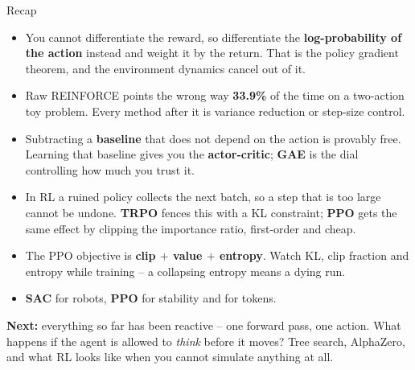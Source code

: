 \documentclass[aspectratio=169]{beamer}
\begin{document}
\begin{frame}{Recap}
  \footnotesize
  \begin{itemize}\itemsep4pt
    \item You cannot differentiate the reward, so differentiate the \textbf{log-probability of
          the action} instead and weight it by the return. That is the policy gradient theorem,
          and the environment dynamics cancel out of it.
    \item Raw REINFORCE points the wrong way \textbf{33.9\%} of the time on a two-action toy
          problem. Every method after it is variance reduction or step-size control.
    \item Subtracting a \textbf{baseline} that does not depend on the action is provably free.
          Learning that baseline gives you the \textbf{actor-critic}; \textbf{GAE} is the dial
          controlling how much you trust it.
    \item In RL a ruined policy collects the next batch, so a step that is too large cannot be
          undone. \textbf{TRPO} fences this with a KL constraint; \textbf{PPO} gets the same
          effect by clipping the importance ratio, first-order and cheap.
    \item The PPO objective is \textbf{clip $+$ value $+$ entropy}. Watch KL, clip fraction and
          entropy while training -- a collapsing entropy means a dying run.
    \item \textbf{SAC} for robots, \textbf{PPO} for stability and for tokens.
  \end{itemize}

  \vskip 5pt
  \begin{tcolorbox}[colback=paramgreen!8, colframe=paramgreen, boxrule=0.6pt, arc=2pt]
    \footnotesize
    \textbf{Next:} everything so far has been reactive -- one forward pass, one action. What
    happens if the agent is allowed to \emph{think} before it moves? Tree search, AlphaZero, and
    what RL looks like when you cannot simulate anything at all.
  \end{tcolorbox}
\end{frame}
\end{document}
